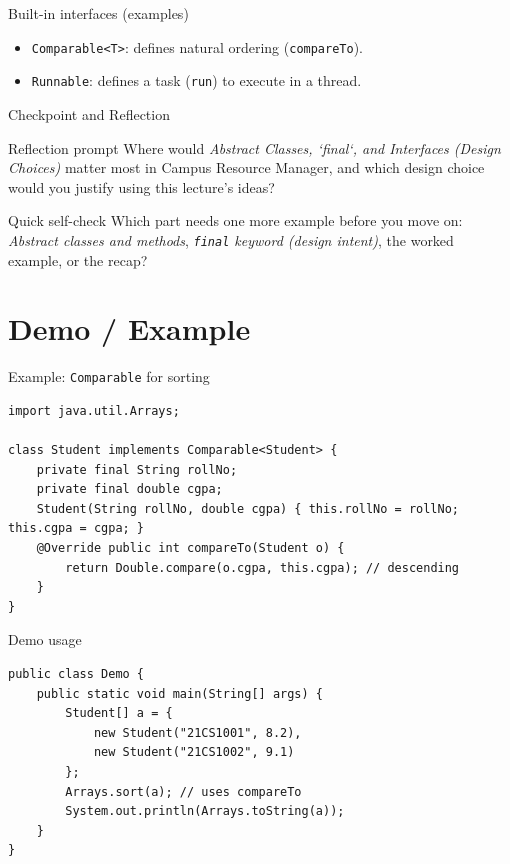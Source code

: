 \documentclass{beamer}
\begin{document}
\begin{frame}{Built-in interfaces (examples)}
  \begin{itemize}[<+->]
    \item \texttt{Comparable<T>}: defines natural ordering (\texttt{compareTo}).
    \item \texttt{Runnable}: defines a task (\texttt{run}) to execute in a thread.
  \end{itemize}
  \slidesources{\OOPSUnitIISources}
\end{frame}

\begin{frame}{Checkpoint and Reflection}
\begin{block}{Reflection prompt}
Where would \textit{Abstract Classes, `final`, and Interfaces (Design Choices)} matter most in Campus Resource Manager, and which design choice would you justify using this lecture's ideas?
\end{block}
\begin{block}{Quick self-check}
Which part needs one more example before you move on: \textit{Abstract classes and methods}, \textit{\texttt{final} keyword (design intent)}, the worked example, or the recap?
\end{block}
  \slidesources{\OOPSUnitIISources}
\end{frame}

\section{Demo / Example}
\label{sec:demo}

\begin{frame}[fragile]{Example: \texttt{Comparable} for sorting}
\begin{lstlisting}
import java.util.Arrays;

class Student implements Comparable<Student> {
    private final String rollNo;
    private final double cgpa;
    Student(String rollNo, double cgpa) { this.rollNo = rollNo; this.cgpa = cgpa; }
    @Override public int compareTo(Student o) {
        return Double.compare(o.cgpa, this.cgpa); // descending
    }
}
\end{lstlisting}
  \slidesources{\OOPSUnitIISources}
\end{frame}

\begin{frame}[fragile]{Demo usage}
\begin{lstlisting}
public class Demo {
    public static void main(String[] args) {
        Student[] a = {
            new Student("21CS1001", 8.2),
            new Student("21CS1002", 9.1)
        };
        Arrays.sort(a); // uses compareTo
        System.out.println(Arrays.toString(a));
    }
}
\end{lstlisting}
  \slidesources{\OOPSUnitIISources}
\end{frame}
\end{document}
